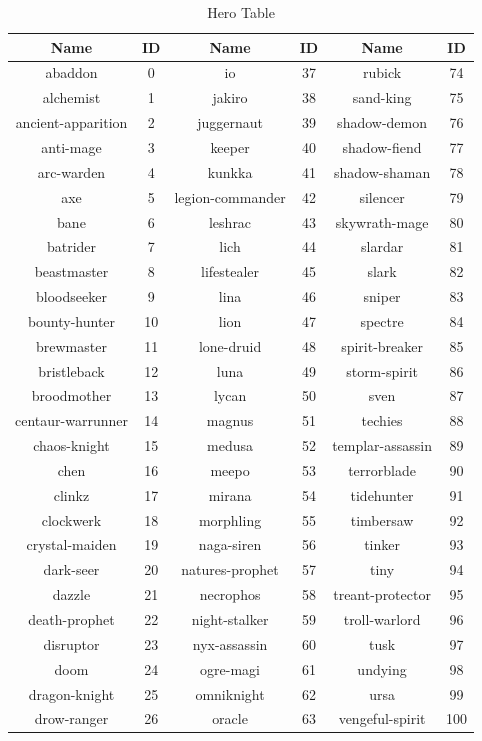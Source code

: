 \begin{table}[!tb] 
\scriptsize
\centering \caption{Hero Table}
\label{table:hero} 
\begin{tabular} {|c|c|c|c|c|c|} 
\hline Name & ID & Name & ID & Name & ID
\\ \hline abaddon&0&io&37&rubick&74
\\ \hline alchemist&1&jakiro&38&sand-king&75
\\ \hline ancient-apparition&2&juggernaut&39&shadow-demon&76
\\ \hline anti-mage&3&keeper&40&shadow-fiend&77
\\ \hline arc-warden&4&kunkka&41&shadow-shaman&78
\\ \hline axe&5&legion-commander&42&silencer&79
\\ \hline bane&6&leshrac&43&skywrath-mage&80
\\ \hline batrider&7&lich&44&slardar&81
\\ \hline beastmaster&8&lifestealer&45&slark&82
\\ \hline bloodseeker&9&lina&46&sniper&83
\\ \hline bounty-hunter&10&lion&47&spectre&84
\\ \hline brewmaster&11&lone-druid&48&spirit-breaker&85
\\ \hline bristleback&12&luna&49&storm-spirit&86
\\ \hline broodmother&13&lycan&50&sven&87
\\ \hline centaur-warrunner&14&magnus&51&techies&88
\\ \hline chaos-knight&15&medusa&52&templar-assassin&89
\\ \hline chen&16&meepo&53&terrorblade&90
\\ \hline clinkz&17&mirana&54&tidehunter&91
\\ \hline clockwerk&18&morphling&55&timbersaw&92
\\ \hline crystal-maiden&19&naga-siren&56&tinker&93
\\ \hline dark-seer&20&natures-prophet&57&tiny&94
\\ \hline dazzle&21&necrophos&58&treant-protector&95
\\ \hline death-prophet&22&night-stalker&59&troll-warlord&96
\\ \hline disruptor&23&nyx-assassin&60&tusk&97
\\ \hline doom&24&ogre-magi&61&undying&98
\\ \hline dragon-knight&25&omniknight&62&ursa&99
\\ \hline drow-ranger&26&oracle&63&vengeful-spirit&100

\end{tabular}
\end{table}
